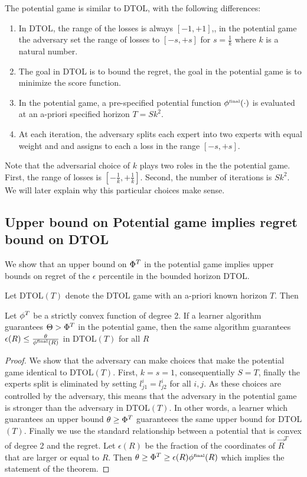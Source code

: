\documentclass[anon,12pt]{colt2024} %
\begin{document}
The potential game is similar to DTOL, with the following differences:
\begin{enumerate}
\item In DTOL, the range of the losses is always $[-1,+1]$,, in the
  potential game the adversary set the range of losses to $[-s,+s]$
  for $s = \frac{1}{k}$ where $k$ is a natural number.
\item The goal in DTOL is to bound the regret, the goal in the
  potential game is to minimize the score function.
\item In the potential game, a pre-specified potential function
  $\phi^{\mbox{\tiny final}}(\cdot)$ is evaluated at an a-priori specified horizon
  $T=S k^2$.
\item At each iteration, the adversary splits each expert into two
  experts with equal weight and and assigns to each a loss in the
  range $[-s,+s]$.
\end{enumerate}
Note that the adversarial choice of $k$ plays two roles in the
the potential game. First, the range of losses is
$[-\frac{1}{k},+\frac{1}{k}]$.  Second, the number of iterations is
$Sk^2$. We will later explain why this particular choices make sense.



\newcommand{\Ndist}{{\cal N}}

\subsection{Upper bound on Potential game implies regret bound on DTOL}

We show that an upper bound on $\Phi^T$ in the potential game
implies upper bounds on regret of the $\epsilon$ percentile in the bounded horizon DTOL.

Let DTOL$(T)$ denote the DTOL game with an a-priori known horizon $T$. Then
\begin{theorem}
  Let $\phi^T$ be a strictly convex function of degree 2.
  If a learner algorithm guarantees $\Theta > \Phi^T$ in the potential game, then the same algorithm guarantees
  $\epsilon(R) \leq \frac{\theta}{\phi^{\mbox{\tiny final}}(R)}$ in DTOL$(T)$ for all $R$
\end{theorem}
\begin{proof} We show that the adversary can make choices that make the
potential game identical to DTOL$(T)$. First, $k=s=1$, consequentially $S=T$, finally the experts split is eliminated by
setting $l_{j1}^i = l_{j2}^i$ for all $i,j$. As these choices are
controlled by the adversary, this means that the adversary in the
potential game is stronger than the adversary in DTOL$(T)$. In other
words, a learner which guarantees an upper bound $\theta\geq\Phi^T$
guaranteees the same upper bound for DTOL$(T)$. Finally we use the
standard relationship between a potential that is convex of degree 2 and the regret.
Let $\epsilon(R)$ be the fraction of the coordinates of $\vec{R}^T$  that are larger or equal to $R$. Then
$\theta \geq \Phi^T \geq \epsilon(R) \phi^{\mbox{\tiny final}}(R)$ which implies the statement of the theorem.
\end{proof}
\end{document}
